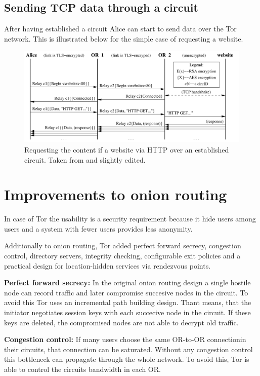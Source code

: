\subsection{Sending TCP data through a circuit}

After having established a circuit Alice can start to send data over the Tor network. This is illustrated below for the simple case of requesting a website.

\begin{figure}
	\includegraphics[width=\columnwidth]{img/http_request.png}
	\caption{Requesting the content if a website via HTTP over an established circuit. Taken from \cite{tor2004original} and slightly edited.}
	\label{img_http_request}
\end{figure}

\section{Improvements to onion routing}

In case of Tor the usability is a security requirement because it hide users among users and a system with fewer users provides less anonymity.


Additionally to onion routing, Tor added perfect forward secrecy, congestion control, directory servers, integrity checking, configurable exit policies and a practical design for location-hidden services via rendezvous points.

\textbf{Perfect forward secrecy:} In the original onion routing design a single hostile node can record traffic and later compromise succesive nodes in the circuit. To avoid this Tor uses an incremental path building design. Thant means, that the initiator negotiates session keys with each succecive node in the circuit. If these keys are deleted, the compromised nodes are not able to decrypt old traffic.

\textbf{Congestion control:} If many users choose the same OR-to-OR connectionin their circuits, that connection can be saturated. Without any congestion control this bottleneck can propagate through the whole network. To avoid this, Tor is able to control the circuits bandwidth in each OR. 

